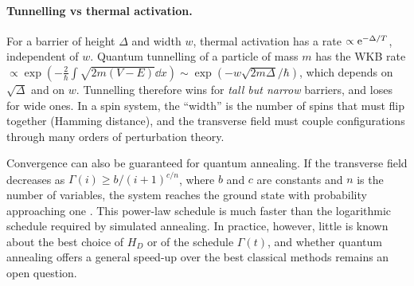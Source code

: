 \paragraph{Tunnelling vs thermal activation.} For a barrier of height $\Delta$ and width $w$, thermal activation has a rate $\propto\mathrm e^{-\Delta/T}$, independent of $w$. Quantum tunnelling of a particle of mass $m$ has the
WKB rate $\propto\exp(-\frac{2}{\hbar}\int\sqrt{2m(V-E)}\dd x)\sim\exp(-w\sqrt{2m\Delta}/\hbar)$, which depends on $\sqrt\Delta$ and on $w$. Tunnelling therefore wins for \emph{tall but narrow} barriers, and loses
for wide ones. In a spin system, the ``width'' is the number of spins that must flip together (Hamming distance), and the transverse field must couple configurations through many orders of perturbation theory.

Convergence can also be guaranteed for quantum annealing. If the transverse field decreases as $\Gamma(i)\ge b/(i+1)^{c/n}$, where $b$ and $c$ are constants and $n$ is the number of variables, the system reaches the ground
state with probability approaching one \cite{MoritaNishimori2008}. This power-law schedule is much faster than the logarithmic schedule required by simulated annealing. In practice, however, little is known about the best
choice of $H_D$ or of the schedule $\Gamma(t)$, and whether quantum annealing offers a general speed-up over the best classical methods remains an open question.

